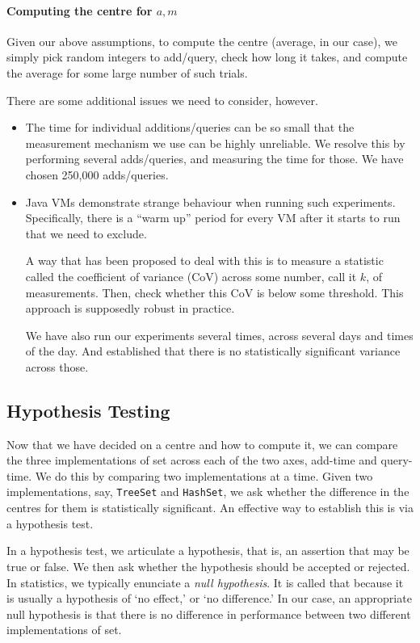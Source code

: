 \paragraph{Computing the centre for $a, m$} Given our above
assumptions, to compute the centre (average, in our case), we
simply pick random integers to add/query, check how long it
takes, and compute the average for some large number of such
trials.

There are some additional issues we need to consider, however.

\begin{itemize}
    \item The time for individual additions/queries can be
	so small that the measurement mechanism we use can
	be highly unreliable. We resolve this by performing
	several adds/queries, and measuring the time for those.
	We have chosen 250,000 adds/queries.

    \item Java VMs demonstrate strange behaviour when running
	such experiments. Specifically, there is a ``warm up''
	period for every VM after it starts to run
	that we need to exclude.

	A way that has been proposed to deal with this \cite{cofvar}
	is to measure a statistic called the coefficient
	of variance (CoV) across some number, call it
	$k$, of measurements. Then, check whether this
	CoV is below some threshold. This approach is
	supposedly robust in practice.

	We have also run our experiments several times, across
	several days and times of the day. And established that
	there is no statistically significant variance across
	those.
\end{itemize}

\subsection*{Hypothesis Testing}\label{sec:statistics:hypo}
Now that we have decided on a centre and how to compute it,
we can compare the three implementations of set across
each of the two axes, add-time and query-time.
We do this by comparing two implementations at a time.
Given two implementations, say, \texttt{TreeSet} and \texttt{HashSet},
we ask whether the difference in the centres for them
is statistically significant. An effective way to establish
this is via a hypothesis test.

In a hypothesis test, we articulate a hypothesis, that is,
an assertion that may be true or false. We then ask whether
the hypothesis should be accepted or rejected. In statistics,
we typically enunciate a \emph{null hypothesis}.
It is called that because it is usually a hypothesis of
`no effect,' or `no difference.' In our case, an appropriate
null hypothesis is that there is no difference in performance
between two different implementations of set.

